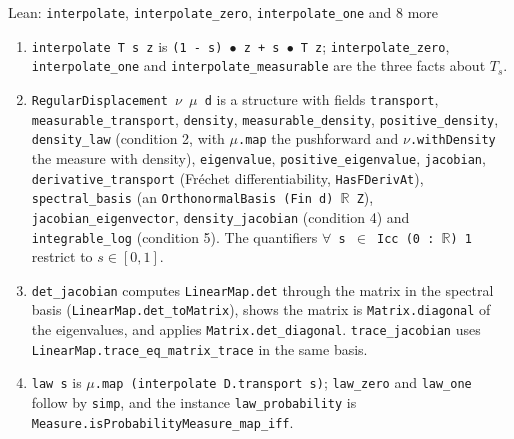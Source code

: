\documentclass[11pt,a4paper]{report}
\begin{document}
\begin{leanbox}{Lean: \texttt{interpolate}, \texttt{interpolate\_\allowbreak{}zero}, \texttt{interpolate\_\allowbreak{}one} and 8 more}
\begin{enumerate}
\item \texttt{interpolate T s z} is \texttt{(1 -\allowbreak{} s) \ensuremath{\bullet} z + s \ensuremath{\bullet} T z}; \texttt{interpolate\_\allowbreak{}zero}, \texttt{interpolate\_\allowbreak{}one} and \texttt{interpolate\_\allowbreak{}measurable} are the three facts about \(T_s\).

\item \texttt{Regular\allowbreak{}Displacement \ensuremath{\nu} \ensuremath{\mu} d} is a structure with fields \texttt{transport}, \texttt{measurable\_\allowbreak{}transport}, \texttt{density}, \texttt{measurable\_\allowbreak{}density}, \texttt{positive\_\allowbreak{}density}, \texttt{density\_\allowbreak{}law} (condition 2, with \texttt{\ensuremath{\mu}.\allowbreak{}map} the pushforward and \texttt{\ensuremath{\nu}.\allowbreak{}with\allowbreak{}Density} the measure with density), \texttt{eigenvalue}, \texttt{positive\_\allowbreak{}eigenvalue}, \texttt{jacobian}, \texttt{derivative\_\allowbreak{}transport} (Fréchet differentiability, \texttt{Has\allowbreak{}FDeriv\allowbreak{}At}), \texttt{spectral\_\allowbreak{}basis} (an \texttt{Orthonormal\allowbreak{}Basis (Fin d) \ensuremath{\mathbb R} Z}), \texttt{jacobian\_\allowbreak{}eigenvector}, \texttt{density\_\allowbreak{}jacobian} (condition 4) and \texttt{integrable\_\allowbreak{}log} (condition 5). The quantifiers \texttt{\ensuremath{\forall} s \ensuremath{\in} Icc (0 : \ensuremath{\mathbb R}) 1} restrict to \(s\in[0,1]\).

\item \texttt{det\_\allowbreak{}jacobian} computes \texttt{Linear\allowbreak{}Map.\allowbreak{}det} through the matrix in the spectral basis (\texttt{Linear\allowbreak{}Map.\allowbreak{}det\_\allowbreak{}to\allowbreak{}Matrix}), shows the matrix is \texttt{Matrix.\allowbreak{}diagonal} of the eigenvalues, and applies \texttt{Matrix.\allowbreak{}det\_\allowbreak{}diagonal}. \texttt{trace\_\allowbreak{}jacobian} uses \texttt{Linear\allowbreak{}Map.\allowbreak{}trace\_\allowbreak{}eq\_\allowbreak{}matrix\_\allowbreak{}trace} in the same basis.

\item \texttt{law s} is \texttt{\ensuremath{\mu}.\allowbreak{}map (interpolate D.\allowbreak{}transport s)}; \texttt{law\_\allowbreak{}zero} and \texttt{law\_\allowbreak{}one} follow by \texttt{simp}, and the instance \texttt{law\_\allowbreak{}probability} is \texttt{Measure.\allowbreak{}is\allowbreak{}Probability\allowbreak{}Measure\_\allowbreak{}map\_\allowbreak{}iff}.

\end{enumerate}
\end{leanbox}
\end{document}
